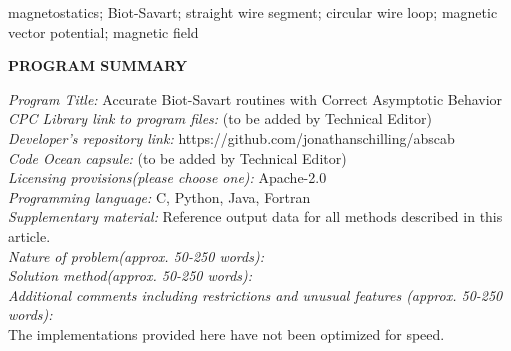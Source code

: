 \documentclass[preprint,12pt]{elsarticle}
\begin{document}
\begin{frontmatter}
\begin{keyword}
magnetostatics; Biot-Savart; straight wire segment; circular wire loop; magnetic vector potential; magnetic field
\end{keyword}

\end{frontmatter}



{\bf PROGRAM SUMMARY}

\begin{small}
\noindent
{\em Program Title:} Accurate Biot-Savart routines with Correct Asymptotic Behavior \\
{\em CPC Library link to program files:} (to be added by Technical Editor) \\
{\em Developer's repository link:} https://github.com/jonathanschilling/abscab \\
{\em Code Ocean capsule:} (to be added by Technical Editor)\\
{\em Licensing provisions(please choose one):} Apache-2.0 \\
{\em Programming language:} C, Python, Java, Fortran \\
{\em Supplementary material:} Reference output data for all methods described in this article. \\
{\em Nature of problem(approx. 50-250 words):}\\
{\em Solution method(approx. 50-250 words):}\\
{\em Additional comments including restrictions and unusual features (approx. 50-250 words):}\\
The implementations provided here have not been optimized for speed.
   \\
\end{small}









\appendix
\end{document}
